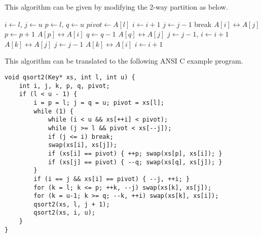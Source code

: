 \documentclass[UTF8]{article}
\begin{document}
This algorithm can be given by modifying the 2-way partition as below.

\begin{algorithmic}[1]
    \State $i \gets l$, $j \gets u$
    \State $p \gets l$, $q \gets u$ 
    \State $pivot \gets A[l]$
    \Loop
      \Repeat
        \State $i \gets i + 1$
       
      \Repeat
        \State $j \gets j - 1$
       
        \State break 
      \EndIf
      \State {} $A[i] \leftrightarrow A[j]$
       
        \State $p \gets p + 1$
        \State {} $A[p] \leftrightarrow A[i]$
      \EndIf
        \State $q \gets q - 1$
        \State {} $A[q] \leftrightarrow A[j]$
      \EndIf
    \EndLoop
     
      \State $j \gets j - 1$, $i \gets i + 1$
    \EndIf
     
      \State {} $A[k] \leftrightarrow A[j]$
      \State $j \gets j - 1$
    \EndFor
      \State {} $A[k] \leftrightarrow A[i]$
      \State $i \gets i + 1$
    \EndFor
    \State {}
    \State {}
  \EndIf
\EndProcedure
\end{algorithmic}

This algorithm can be translated to the following ANSI C example program.

\lstset{language=C}
\begin{lstlisting}
void qsort2(Key* xs, int l, int u) {
    int i, j, k, p, q, pivot;
    if (l < u - 1) {
        i = p = l; j = q = u; pivot = xs[l];
        while (1) {
            while (i < u && xs[++i] < pivot);
            while (j >= l && pivot < xs[--j]);
            if (j <= i) break;
            swap(xs[i], xs[j]);
            if (xs[i] == pivot) { ++p; swap(xs[p], xs[i]); }
            if (xs[j] == pivot) { --q; swap(xs[q], xs[j]); }
        }
        if (i == j && xs[i] == pivot) { --j, ++i; }
        for (k = l; k <= p; ++k, --j) swap(xs[k], xs[j]);
        for (k = u-1; k >= q; --k, ++i) swap(xs[k], xs[i]);
        qsort2(xs, l, j + 1);
        qsort2(xs, i, u);
    }
}
\end{lstlisting}
\end{document}
